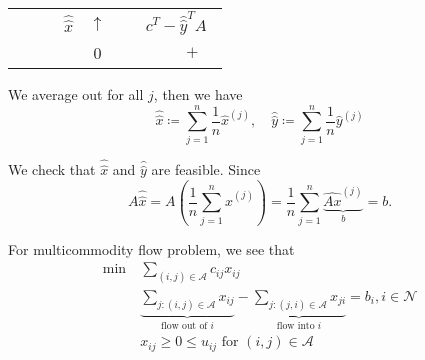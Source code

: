 \begin{table}[H]
\begin{tabular}{c|ccccc|ccccc}
		\hline
		           &                                           &                                              & \(\hat{\hat{x}}\) & \(\uparrow\) &            & \multicolumn{5}{c}{\(c^{T}-\hat{\hat{y}}^{T}A\)}                                                                                                                     \\
		           &                                           &                                              &                   & 0            &            &                                                  &            &                                                                            & \(+\)      &            \\
		\bottomrule
	\end{tabular}
\end{table}
\begin{intuition}
	We average out for all \(j\), then we have
	\[
		\hat{\hat{x}} \coloneqq \sum\limits_{j=1}^{n} \frac{1}{n}\hat{x}^{(j)},\quad \hat{\hat{y}} \coloneqq \sum\limits_{j=1}^{n} \frac{1}{n}\hat{y}^{(j)}
	\]
\end{intuition}

We check that \(\hat{\hat{x}}\) and \(\hat{\hat{y}}\) are feasible. Since
\[
	A\hat{\hat{x}} = A\left( \frac{1}{n}\sum\limits_{j=1}^{n} \hat{x}^{(j)} \right) = \frac{1}{n}\sum\limits_{j=1}^{n} \underbrace{\hat{Ax}^{(j)}}_{b} = b.
\]

\begin{problem}
For multicommodity flow problem, we see that
\begin{align*}
	\min~ & \sum\limits_{(i, j)\in \mathcal{A}} c_{ij}x_{ij}                                                                                                                                                     \\
	      & \underbrace{\sum\limits_{j\colon (i, j)\in\mathcal{A}} x_{ij}}_{\text{flow out of }i} - \underbrace{\sum\limits_{j\colon (j, i)\in\mathcal{A}} x_{ji}}_{\text{flow into }i}  = b_i, i \in\mathcal{N} \\
	      & x_{ij}\geq 0 \leq u_{ij} \text{ for }(i, j)\in\mathcal{A}
\end{align*}
\end{problem}

